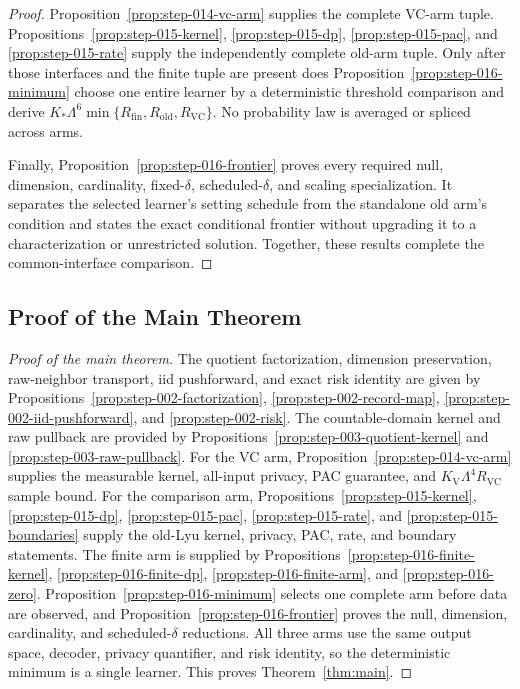\begin{proof}
Proposition~\ref{prop:step-014-vc-arm} supplies the complete
VC-arm tuple. Propositions~\ref{prop:step-015-kernel},
\ref{prop:step-015-dp}, \ref{prop:step-015-pac}, and
\ref{prop:step-015-rate} supply the independently complete old-arm tuple.
Only after those interfaces and the finite tuple are present does
Proposition~\ref{prop:step-016-minimum} choose one entire learner by a
deterministic threshold comparison and derive
\(K_*\Lambda^6\min\{R_{\mathrm{fin}},R_{\mathrm{old}},R_{\mathrm{VC}}\}\).
No probability law is averaged or spliced across arms.

Finally, Proposition~\ref{prop:step-016-frontier} proves every required null,
dimension, cardinality, fixed-\(\delta\), scheduled-\(\delta\), and scaling
specialization. It separates the selected learner's setting schedule from
the standalone old arm's condition and states the exact conditional frontier
without upgrading it to a characterization or unrestricted solution. Together,
these results complete the common-interface comparison.



\end{proof}

\subsection{Proof of the Main Theorem}\label{app:main-proof}

\begin{proof}[Proof of the main theorem]
The quotient factorization, dimension preservation, raw-neighbor transport,
iid pushforward, and exact risk identity are given by
Propositions~\ref{prop:step-002-factorization},
\ref{prop:step-002-record-map},
\ref{prop:step-002-iid-pushforward}, and
\ref{prop:step-002-risk}. The countable-domain kernel and raw pullback are
provided by Propositions~\ref{prop:step-003-quotient-kernel} and
\ref{prop:step-003-raw-pullback}. For the VC arm,
Proposition~\ref{prop:step-014-vc-arm} supplies the measurable kernel,
all-input privacy, PAC guarantee, and
$K_{\mathrm V}\Lambda^4R_{\mathrm{VC}}$ sample bound. For the comparison
arm, Propositions~\ref{prop:step-015-kernel},
\ref{prop:step-015-dp}, \ref{prop:step-015-pac},
\ref{prop:step-015-rate}, and
\ref{prop:step-015-boundaries} supply the old-Lyu kernel, privacy, PAC,
rate, and boundary statements. The finite arm is supplied by
Propositions~\ref{prop:step-016-finite-kernel},
\ref{prop:step-016-finite-dp},
\ref{prop:step-016-finite-arm}, and
\ref{prop:step-016-zero}. Proposition~\ref{prop:step-016-minimum}
selects one complete arm before data are observed, and
Proposition~\ref{prop:step-016-frontier} proves the null, dimension,
cardinality, and scheduled-\(\delta\) reductions. All three arms use the
same output space, decoder, privacy quantifier, and risk identity, so the
deterministic minimum is a single learner. This proves Theorem~\ref{thm:main}.
\end{proof}
